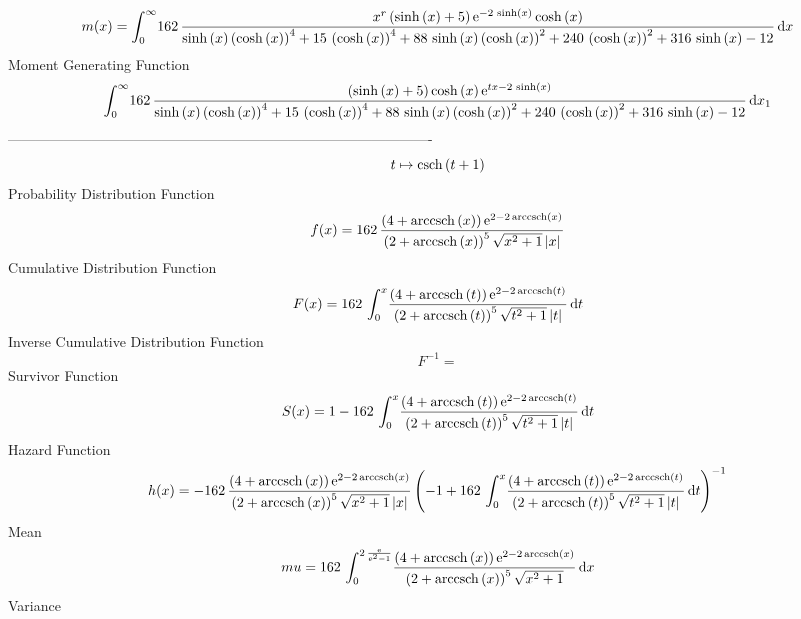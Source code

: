 \documentclass[12pt]{article}
\begin{document}
 $$ m(x) = \int_{0}^{\infty }\!162\,{\frac {{x}^{r} \left( \sinh \left( x
 \right) +5 \right) {{\rm e}^{-2\,\sinh \left( x \right) }}\cosh
 \left( x \right) }{\sinh \left( x \right)  \left( \cosh \left( x
 \right)  \right) ^{4}+15\, \left( \cosh \left( x \right)  \right) ^{4
}+88\,\sinh \left( x \right)  \left( \cosh \left( x \right)  \right) ^
{2}+240\, \left( \cosh \left( x \right)  \right) ^{2}+316\,\sinh
 \left( x \right) -12}}\,{\rm d}x
$$ Moment Generating Function 
 $$\int_{0}^{\infty }\!162\,{\frac { \left( \sinh \left( x \right) +5
 \right) \cosh \left( x \right) {{\rm e}^{tx-2\,\sinh \left( x
 \right) }}}{\sinh \left( x \right)  \left( \cosh \left( x \right) 
 \right) ^{4}+15\, \left( \cosh \left( x \right)  \right) ^{4}+88\,
\sinh \left( x \right)  \left( \cosh \left( x \right)  \right) ^{2}+
240\, \left( \cosh \left( x \right)  \right) ^{2}+316\,\sinh \left( x
 \right) -12}}\,{\rm d}x_{{1}}
$$-------------------------------------------------------------------------------------------  \\$$t\mapsto {\rm csch} \left(t+1\right)
$$Probability Distribution Function 
$$  f(x)=162\,{\frac { \left( 4+{\rm arccsch} \left(x\right) \right) {{\rm e}^{
2-2\,{\rm arccsch} \left(x\right)}}}{ \left( 2+{\rm arccsch} \left(x
\right) \right) ^{5}\sqrt {{x}^{2}+1} \left| x \right| }}
$$Cumulative Distribution Function  
 $$F(x)=162\,\int_{0}^{x}\!{\frac { \left( 4+{\rm arccsch} \left(t\right)
 \right) {{\rm e}^{2-2\,{\rm arccsch} \left(t\right)}}}{ \left( 2+
{\rm arccsch} \left(t\right) \right) ^{5}\sqrt {{t}^{2}+1} \left| t
 \right| }}\,{\rm d}t
$$ Inverse Cumulative Distribution Function 
  $$F^{-1} = $$Survivor Function 
 $$ S(x)=1-162\,\int_{0}^{x}\!{\frac { \left( 4+{\rm arccsch} \left(t\right)
 \right) {{\rm e}^{2-2\,{\rm arccsch} \left(t\right)}}}{ \left( 2+
{\rm arccsch} \left(t\right) \right) ^{5}\sqrt {{t}^{2}+1} \left| t
 \right| }}\,{\rm d}t
$$ Hazard Function 
 $$ h(x)=-162\,{\frac { \left( 4+{\rm arccsch} \left(x\right) \right) {{\rm e}^
{2-2\,{\rm arccsch} \left(x\right)}}}{ \left( 2+{\rm arccsch} \left(x
\right) \right) ^{5}\sqrt {{x}^{2}+1} \left| x \right| } \left( -1+162
\,\int_{0}^{x}\!{\frac { \left( 4+{\rm arccsch} \left(t\right)
 \right) {{\rm e}^{2-2\,{\rm arccsch} \left(t\right)}}}{ \left( 2+
{\rm arccsch} \left(t\right) \right) ^{5}\sqrt {{t}^{2}+1} \left| t
 \right| }}\,{\rm d}t \right) ^{-1}}
$$Mean 
 $$ mu=162\,\int_{0}^{2\,{\frac {{\rm e}}{{{\rm e}^{2}}-1}}}\!{\frac {
 \left( 4+{\rm arccsch} \left(x\right) \right) {{\rm e}^{2-2\,
{\rm arccsch} \left(x\right)}}}{ \left( 2+{\rm arccsch} \left(x\right)
 \right) ^{5}\sqrt {{x}^{2}+1}}}\,{\rm d}x
$$ Variance 
\end{document}
